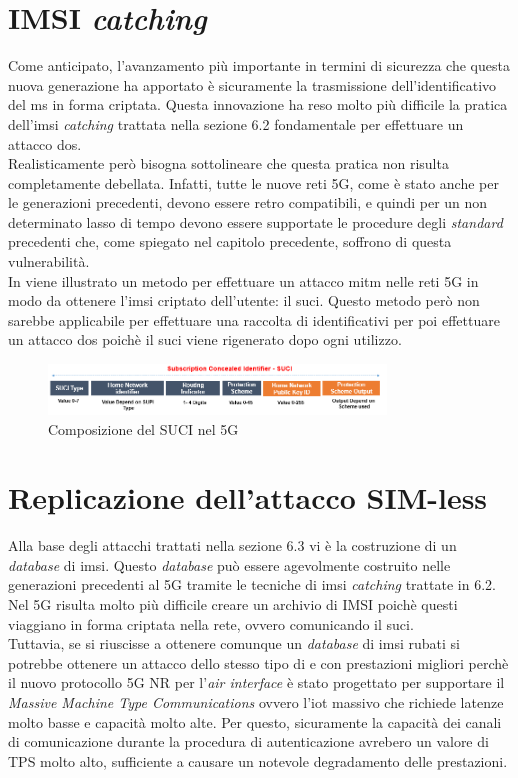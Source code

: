 \section{IMSI \textit{catching}}
Come anticipato, l'avanzamento più importante in termini di sicurezza che questa nuova generazione ha apportato è sicuramente la trasmissione dell'identificativo del \gls{ms} in forma 
criptata. Questa innovazione ha reso molto più difficile la pratica dell'\gls{imsi} \textit{catching} trattata nella sezione 6.2 fondamentale per effettuare un attacco \gls{dos}.\\
Realisticamente però bisogna sottolineare che questa pratica non risulta completamente debellata. Infatti, tutte le nuove reti 5G, come è stato anche per le generazioni precedenti, devono 
essere retro compatibili, e quindi per un non determinato lasso di tempo devono essere supportate le procedure degli \textit{standard} precedenti che, come spiegato nel capitolo precedente, soffrono 
di questa vulnerabilità.\\
In \cite{suci-catch} viene illustrato un metodo per effettuare un attacco \gls{mitm} nelle reti 5G in modo da ottenere l'\gls{imsi} criptato dell'utente: il \gls{suci}. Questo metodo però non sarebbe applicabile per effettuare 
una raccolta di identificativi per poi effettuare un attacco \gls{dos} poichè il \gls{suci} viene rigenerato dopo ogni utilizzo.
\begin{figure}[ht]
    \centering
    \includegraphics[width=0.8\textwidth]{images/5g-suci.png}
    \caption{Composizione del SUCI nel 5G}
\end{figure}

\section{Replicazione dell'attacco SIM-less}
Alla base degli attacchi trattati nella sezione 6.3 vi è la costruzione di un \textit{database} di \gls{imsi}. Questo \textit{database} può essere agevolmente costruito nelle generazioni precedenti al 5G 
tramite le tecniche di \gls{imsi} \textit{catching} trattate in 6.2. Nel 5G risulta molto più difficile creare un archivio di IMSI poichè questi viaggiano in forma criptata nella rete, ovvero comunicando il \gls{suci}.\\
Tuttavia, se si riuscisse a ottenere comunque un \textit{database} di \gls{imsi} rubati si potrebbe ottenere un attacco dello stesso tipo di \cite{gsm-dos-simless} e \cite{umts-dos} con prestazioni migliori 
perchè il nuovo protocollo 5G NR\cite{5g-nr} per l'\textit{air interface} è stato progettato per supportare il \textit{Massive Machine Type Communications} ovvero l'\gls{iot} massivo che richiede latenze molto basse e capacità molto alte.
Per questo, sicuramente la capacità dei canali di comunicazione durante la procedura di autenticazione avrebero un valore di TPS molto alto, sufficiente a causare un notevole degradamento delle prestazioni.

